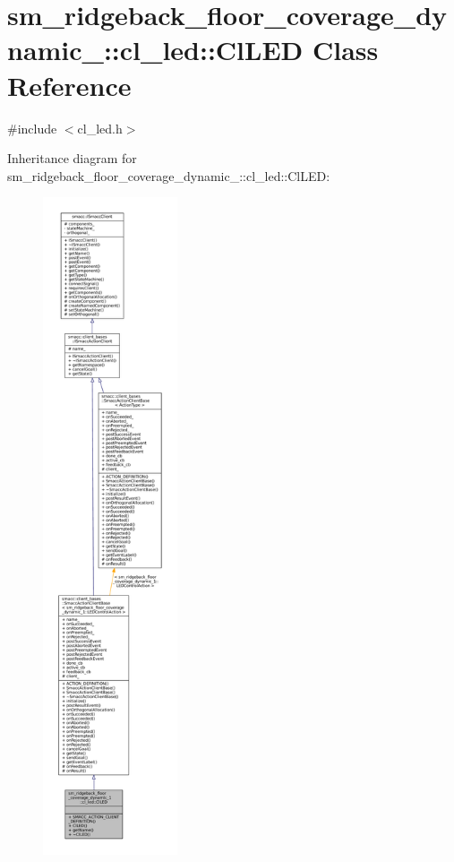 \hypertarget{classsm__ridgeback__floor__coverage__dynamic__1_1_1cl__led_1_1ClLED}{}\section{sm\+\_\+ridgeback\+\_\+floor\+\_\+coverage\+\_\+dynamic\+\_\+:\+:cl\+\_\+led\+:\+:Cl\+L\+ED Class Reference}
\label{classsm__ridgeback__floor__coverage__dynamic__1_1_1cl__led_1_1ClLED}


{\ttfamily \#include $<$cl\+\_\+led.\+h$>$}



Inheritance diagram for sm\+\_\+ridgeback\+\_\+floor\+\_\+coverage\+\_\+dynamic\+\_\+:\+:cl\+\_\+led\+:\+:Cl\+L\+ED\+:
\nopagebreak
\begin{figure}[H]
\begin{center}
\leavevmode
\includegraphics[height=550pt]{classsm__ridgeback__floor__coverage__dynamic__1_1_1cl__led_1_1ClLED__inherit__graph}
\end{center}
\end{figure}


